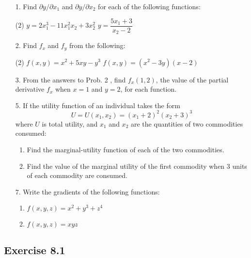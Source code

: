 \documentclass{./../../Latex/homework}
\begin{document}
\begin{enumerate}

\item[1.] Find $\partial y / \partial x_{1}$ and $\partial y / \partial x_{2}$ for each of the following functions:
\begin{tasks}(2)
\task[(a)] $y=2 x_{1}^{3}-11 x_{1}^{2} x_{2}+3 x_{2}^{2}$
\task[(d)]$y=\dfrac{5 x_{1}+3}{x_{2}-2}$ 
\end{tasks}

\item[2.] Find $f_{x}$ and $f_{y}$ from the following:
\begin{tasks}(2)
\task[(a)] $f(x, y)=x^{2}+5 x y-y^{3}$
\task[(b)] $f(x, y)=\left(x^{2}-3 y\right)(x-2)$
\end{tasks}


\item[3.] From the answers to Prob. 2 , find $f_{x}(1,2)$, the value of the partial derivative $f_{x}$ when $x=1$ and $y=2$, for each function.

\item[5.] If the utility function of an individual takes the form
$$U=U\left(x_{1}, x_{2}\right)=\left(x_{1}+2\right)^{2}\left(x_{2}+3\right)^{3}$$
where $U$ is total utility, and $x_{1}$ and $x_{2}$ are the quantities of two commodities consumed:
\begin{enumerate}
  \item Find the marginal-utility function of each of the two commodities.
  \item Find the value of the marginal utility of the first commodity when 3 units of each commodity are consumed.
\end{enumerate}

\item[7.] Write the gradients of the following functions:
\begin{enumerate}
\item $f(x, y, z)=x^{2}+y^{3}+z^{4}$
\item $f(x, y, z)=x y z$
\end{enumerate}
\end{enumerate}

\subsection*{Exercise 8.1}
\end{document}
